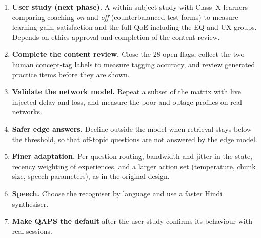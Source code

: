 \begin{enumerate}
  \item \textbf{User study (next phase).} A within-subject study with Class~X learners comparing coaching
    \emph{on} and \emph{off} (counterbalanced test forms) to measure learning gain, satisfaction and the
    full QoE including the EQ and UX groups. Depends on ethics approval and completion of the content
    review.
  \item \textbf{Complete the content review.} Close the 28 open flags, collect the two human concept-tag
    labels to measure tagging accuracy, and review generated practice items before they are shown.
  \item \textbf{Validate the network model.} Repeat a subset of the matrix with live injected delay and
    loss, and measure the poor and outage profiles on real networks.
  \item \textbf{Safer edge answers.} Decline outside the model when retrieval stays below the threshold,
    so that off-topic questions are not answered by the edge model.
  \item \textbf{Finer adaptation.} Per-question routing, bandwidth and jitter in the state, recency
    weighting of experiences, and a larger action set (temperature, chunk size, speech parameters), as
    in the original design.
  \item \textbf{Speech.} Choose the recogniser by language and use a faster Hindi synthesiser.
  \item \textbf{Make QAPS the default} after the user study confirms its behaviour with real sessions.
\end{enumerate}
